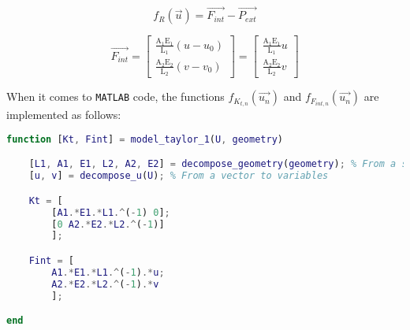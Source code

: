 \begin{equation}
    f_{R}(\vec{u}) = \vec{F_{int}} - \vec{P_{ext}}
    \label{eq:residual_vector_taylor_series_expansion_order_1}
\end{equation}

\begin{equation}
    \vec{F_{int}} =
    \begin{bmatrix}
        \frac{\text{A}_1 \text{E}_1}{\text{L}_1} \left( u - u_0 \right) \\
        \frac{\text{A}_2 \text{E}_2}{\text{L}_2} \left( v - v_0 \right)
    \end{bmatrix}
    =
    \begin{bmatrix}
        \frac{\text{A}_1 \text{E}_1}{\text{L}_1} u \\
        \frac{\text{A}_2 \text{E}_2}{\text{L}_2} v
    \end{bmatrix}
    \label{eq:internal_force_vector_taylor_series_expansion_order_1}
\end{equation}

When it comes to \texttt{MATLAB} code, the functions $f_{K_{t,n}}(\vec{u_n})$ and $f_{F_{int,n}}(\vec{u_n})$ are implemented as follows:

\begin{lstlisting}[language=Matlab]
function [Kt, Fint] = model_taylor_1(U, geometry)

    [L1, A1, E1, L2, A2, E2] = decompose_geometry(geometry); % From a struct to variables
    [u, v] = decompose_u(U); % From a vector to variables

    Kt = [
        [A1.*E1.*L1.^(-1) 0];
        [0 A2.*E2.*L2.^(-1)]
        ];

    Fint = [
        A1.*E1.*L1.^(-1).*u;
        A2.*E2.*L2.^(-1).*v
        ];

end
\end{lstlisting}

